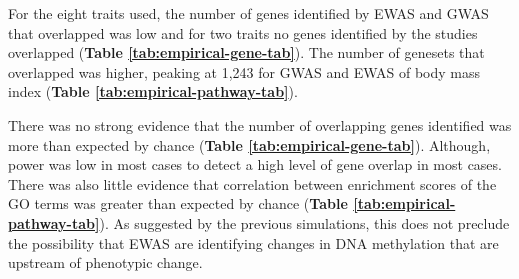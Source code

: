\documentclass[11pt,oneside]{bristolthesis}
\begin{document}
For the eight traits used, the number of genes identified by EWAS and GWAS that overlapped was low and for two traits no genes identified by the studies overlapped (\textbf{Table \ref{tab:empirical-gene-tab}}). The number of genesets that overlapped was higher, peaking at 1,243 for GWAS and EWAS of body mass index (\textbf{Table \ref{tab:empirical-pathway-tab}}).

There was no strong evidence that the number of overlapping genes identified was more than expected by chance (\textbf{Table \ref{tab:empirical-gene-tab}}). Although, power was low in most cases to detect a high level of gene overlap in most cases. There was also little evidence that correlation between enrichment scores of the GO terms was greater than expected by chance (\textbf{Table \ref{tab:empirical-pathway-tab}}). As suggested by the previous simulations, this does not preclude the possibility that EWAS are identifying changes in DNA methylation that are upstream of phenotypic change. \linebreak
\end{document}
